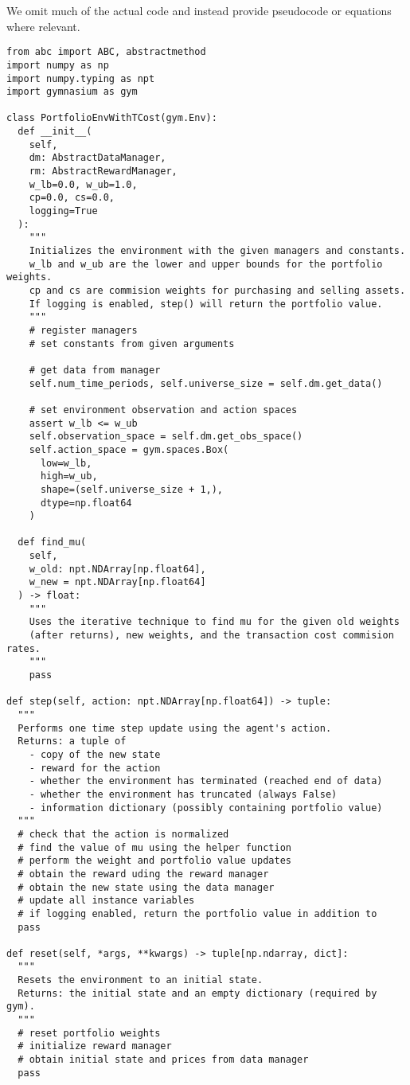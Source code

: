 We omit much of the actual code and instead provide pseudocode or equations where relevant.

\begin{verbatim}
from abc import ABC, abstractmethod
import numpy as np
import numpy.typing as npt
import gymnasium as gym

class PortfolioEnvWithTCost(gym.Env):
  def __init__(
    self,
    dm: AbstractDataManager,
    rm: AbstractRewardManager,
    w_lb=0.0, w_ub=1.0,
    cp=0.0, cs=0.0,
    logging=True
  ):
    """
    Initializes the environment with the given managers and constants.
    w_lb and w_ub are the lower and upper bounds for the portfolio weights.
    cp and cs are commision weights for purchasing and selling assets.
    If logging is enabled, step() will return the portfolio value.
    """
    # register managers
    # set constants from given arguments

    # get data from manager
    self.num_time_periods, self.universe_size = self.dm.get_data()

    # set environment observation and action spaces
    assert w_lb <= w_ub
    self.observation_space = self.dm.get_obs_space()
    self.action_space = gym.spaces.Box(
      low=w_lb,
      high=w_ub,
      shape=(self.universe_size + 1,),
      dtype=np.float64
    )

  def find_mu(
    self,
    w_old: npt.NDArray[np.float64],
    w_new = npt.NDArray[np.float64]
  ) -> float:
    """
    Uses the iterative technique to find mu for the given old weights
    (after returns), new weights, and the transaction cost commision rates.
    """
    pass

def step(self, action: npt.NDArray[np.float64]) -> tuple:
  """
  Performs one time step update using the agent's action.
  Returns: a tuple of
    - copy of the new state
    - reward for the action
    - whether the environment has terminated (reached end of data)
    - whether the environment has truncated (always False)
    - information dictionary (possibly containing portfolio value)
  """
  # check that the action is normalized
  # find the value of mu using the helper function
  # perform the weight and portfolio value updates
  # obtain the reward uding the reward manager
  # obtain the new state using the data manager
  # update all instance variables
  # if logging enabled, return the portfolio value in addition to
  pass

def reset(self, *args, **kwargs) -> tuple[np.ndarray, dict]:
  """
  Resets the environment to an initial state.
  Returns: the initial state and an empty dictionary (required by gym).
  """
  # reset portfolio weights
  # initialize reward manager
  # obtain initial state and prices from data manager
  pass
\end{verbatim}
